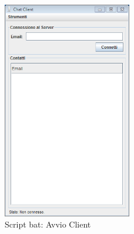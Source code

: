 \documentclass[a4paper, 11pt]{article} %
\begin{document}
\begin{center}
\begin{figure}[H]
\vspace{-1.0cm}
\hspace{2.98cm}
\includegraphics[width=0.5\textwidth]{images/script_bat-4.PNG}
\caption{Script bat: Avvio Client}
\end{figure}
\end{center}


\newpage




\nocite{*}

\end{document}
